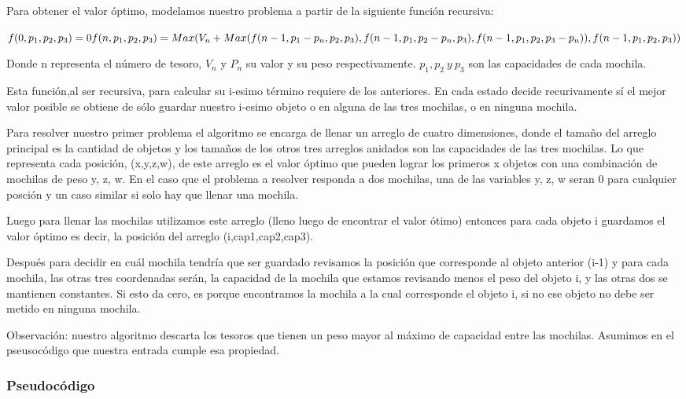 \documentclass[spanish,12pt]{article}
\begin{document}
{   Para obtener el valor óptimo, modelamos nuestro problema a partir de la siguiente función recursiva:

	$f(0,p_{1},p_{2},p_{3})=0 \\
	f(n,p_{1},p_{2},p_{3}) = Max(V_{n}+Max(f(n-1,p_{1}-p_{n},p_{2},p_{3}), f(n-1,p_{1},p_{2}-p_{n},p_{3}), f(n-1,p_{1},p_{2},p_{3}-p_{n})),f(n-1,p_{1},p_{2},p_{3})) $

	Donde n representa el número de tesoro, $V_{n}$ y $P_{n}$ su valor y su peso respectivamente. $p_{1},p_{2}\ y \ p_{3}$ son las capacidades de cada mochila.

	Esta función,al ser recursiva, para calcular su i-esimo término requiere de los anteriores. En cada estado decide recurivamente sí el mejor valor posible se obtiene de sólo guardar nuestro i-esimo objeto o en alguna de las tres mochilas, o en ninguna mochila.  



	Para resolver nuestro primer problema el algoritmo se encarga de llenar un arreglo de cuatro dimensiones, donde el tamaño del arreglo principal es la cantidad de objetos y los tamaños de los otros tres arreglos anidados son las capacidades de las tres mochilas.
	Lo que representa cada posición, (x,y,z,w), de este arreglo es el valor óptimo que pueden lograr los primeros x objetos con una combinación de mochilas de peso y, z, w. En el caso que el problema a resolver responda a dos mochilas, una de las variables y, z, w seran 0 para cualquier posción y un caso similar si solo hay que llenar una mochila.


	Luego para llenar las mochilas utilizamos este arreglo (lleno luego de encontrar el valor ótimo) entonces para cada objeto i guardamos el valor óptimo es decir, la posición del arreglo (i,cap1,cap2,cap3). 

	Después para decidir en cuál mochila tendría que ser guardado revisamos la posición que corresponde al objeto anterior (i-1) y para cada mochila, las otras tres coordenadas serán, la capacidad de la mochila que estamos revisando menos el peso del objeto i, y las otras dos se mantienen constantes. Si esto da cero, es porque encontramos la mochila a la cual corresponde el objeto i, si no ese objeto no debe ser metido en ninguna mochila. 


	Observación: nuestro algoritmo descarta los tesoros que tienen un peso mayor al máximo de capacidad entre las mochilas. Asumimos en el pseusocódigo que nuestra entrada cumple esa propiedad.


\subsubsection{Pseudocódigo}

}
\end{document}
